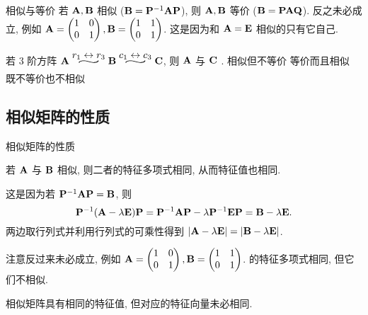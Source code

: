 \begin{frame}{相似与等价}
	\onslide<+->
	若 ${\mathbf{A}},{\mathbf{B}}$ 相似 (${\mathbf{B}}={\mathbf{P}}^{-1}{\mathbf{A}}{\mathbf{P}}$), 则 ${\mathbf{A}},{\mathbf{B}}$ 等价 (${\mathbf{B}}={\mathbf{P}}{\mathbf{A}}{\mathbf{Q}}$).
		反之未必成立, 例如 ${\mathbf{A}}=\begin{pmatrix}
			1&0\\
			0&1
		\end{pmatrix}, {\mathbf{B}}=\begin{pmatrix}
			1&1\\
			0&1
		\end{pmatrix}$.
		这是因为和 ${\mathbf{A}}={\mathbf{E}}$ 相似的只有它自己.
	\onslide<+->
	\begin{example}
		若 $3$ 阶方阵 $\bfA\wsim{r_1\swap r_3}{}\bfB\wsim{c_1\swap c_3}{}\bfC$, 则 ${\mathbf{A}}$ 与 ${\mathbf{C}}$ .
		{相似但不等价}
		{等价而且相似}
		{既不等价也不相似}
	\end{example}
\end{frame}


\subsection{相似矩阵的性质}

\begin{frame}{相似矩阵的性质}
	\onslide<+->
	\begin{theorem}
		若 ${\mathbf{A}}$ 与 ${\mathbf{B}}$ 相似, 则二者的特征多项式相同, 从而特征值也相同.
	\end{theorem}
	\onslide<+->
	这是因为若 ${\mathbf{P}}^{-1}{\mathbf{A}}{\mathbf{P}}={\mathbf{B}}$, 则
	\[{\mathbf{P}}^{-1}({\mathbf{A}}-\lambda{\mathbf{E}}){\mathbf{P}}={\mathbf{P}}^{-1}{\mathbf{A}}{\mathbf{P}}-\lambda{\mathbf{P}}^{-1}{\mathbf{E}}{\mathbf{P}}={\mathbf{B}}-\lambda{\mathbf{E}}.\]
	\onslide<+->
	两边取行列式并利用行列式的可乘性得到 $|{\mathbf{A}}-\lambda{\mathbf{E}}|=|{\mathbf{B}}-\lambda{\mathbf{E}}|$.

	\onslide<+->
	注意反过来未必成立, 例如 ${\mathbf{A}}=\begin{pmatrix}
		1&0\\
		0&1
	\end{pmatrix}, {\mathbf{B}}=\begin{pmatrix}
		1&1\\
		0&1
	\end{pmatrix}$.
	的特征多项式相同, 但它们不相似.

	\onslide<+->
	相似矩阵具有相同的特征值, 但对应的特征向量未必相同.
\end{frame}


